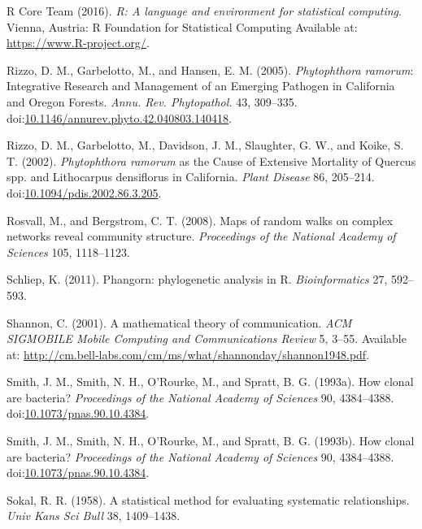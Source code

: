 \documentclass[double,12pt]{beavtex}
\begin{document}
  \hypertarget{ref-R2016}{}
  R Core Team (2016). \emph{R: A language and environment for statistical
  computing}. Vienna, Austria: R Foundation for Statistical Computing
  Available at: \url{https://www.R-project.org/}.
  
  \hypertarget{ref-rizzo2005phytophthora}{}
  Rizzo, D. M., Garbelotto, M., and Hansen, E. M. (2005).
  \emph{Phytophthora ramorum}: Integrative Research and Management of an
  Emerging Pathogen in California and Oregon Forests. \emph{Annu. Rev.
  Phytopathol.} 43, 309--335.
  doi:\href{https://doi.org/10.1146/annurev.phyto.42.040803.140418}{10.1146/annurev.phyto.42.040803.140418}.
  
  \hypertarget{ref-rizzo2002phytophthora}{}
  Rizzo, D. M., Garbelotto, M., Davidson, J. M., Slaughter, G. W., and
  Koike, S. T. (2002). \emph{Phytophthora ramorum} as the Cause of
  Extensive Mortality of Quercus spp. and Lithocarpus densiflorus in
  California. \emph{Plant Disease} 86, 205--214.
  doi:\href{https://doi.org/10.1094/pdis.2002.86.3.205}{10.1094/pdis.2002.86.3.205}.
  
  \hypertarget{ref-rosvall2008maps}{}
  Rosvall, M., and Bergstrom, C. T. (2008). Maps of random walks on
  complex networks reveal community structure. \emph{Proceedings of the
  National Academy of Sciences} 105, 1118--1123.
  
  \hypertarget{ref-phangorn}{}
  Schliep, K. (2011). Phangorn: phylogenetic analysis in R.
  \emph{Bioinformatics} 27, 592--593.
  
  \hypertarget{ref-shannon2001mathematical}{}
  Shannon, C. (2001). A mathematical theory of communication. \emph{ACM
  SIGMOBILE Mobile Computing and Communications Review} 5, 3--55.
  Available at:
  \url{http://cm.bell-labs.com/cm/ms/what/shannonday/shannon1948.pdf}.
  
  \hypertarget{ref-Smith:1993}{}
  Smith, J. M., Smith, N. H., O'Rourke, M., and Spratt, B. G. (1993a). How
  clonal are bacteria? \emph{Proceedings of the National Academy of
  Sciences} 90, 4384--4388.
  doi:\href{https://doi.org/10.1073/pnas.90.10.4384}{10.1073/pnas.90.10.4384}.
  
  \hypertarget{ref-smith1993how}{}
  Smith, J. M., Smith, N. H., O'Rourke, M., and Spratt, B. G. (1993b). How
  clonal are bacteria? \emph{Proceedings of the National Academy of
  Sciences} 90, 4384--4388.
  doi:\href{https://doi.org/10.1073/pnas.90.10.4384}{10.1073/pnas.90.10.4384}.
  
  \hypertarget{ref-sokal1958statistical}{}
  Sokal, R. R. (1958). A statistical method for evaluating systematic
  relationships. \emph{Univ Kans Sci Bull} 38, 1409--1438.
  
\end{document}
